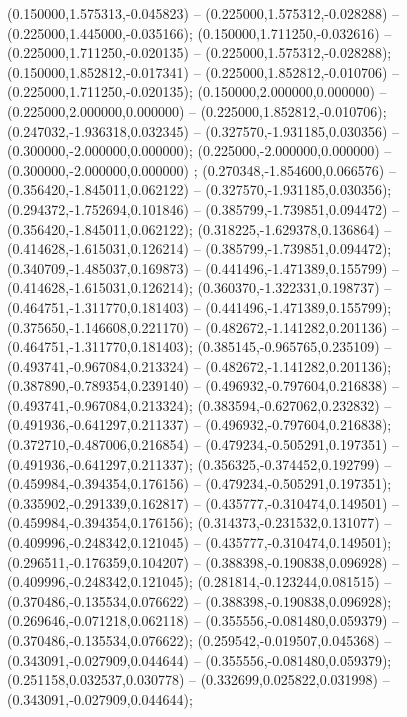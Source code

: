  (0.150000,1.575313,-0.045823) -- (0.225000,1.575312,-0.028288) -- (0.225000,1.445000,-0.035166);
 (0.150000,1.711250,-0.032616) -- (0.225000,1.711250,-0.020135) -- (0.225000,1.575312,-0.028288);
 (0.150000,1.852812,-0.017341) -- (0.225000,1.852812,-0.010706) -- (0.225000,1.711250,-0.020135);
 (0.150000,2.000000,0.000000) -- (0.225000,2.000000,0.000000) -- (0.225000,1.852812,-0.010706);
 (0.247032,-1.936318,0.032345) -- (0.327570,-1.931185,0.030356) -- (0.300000,-2.000000,0.000000);
 (0.225000,-2.000000,0.000000) -- (0.300000,-2.000000,0.000000) ;
 (0.270348,-1.854600,0.066576) -- (0.356420,-1.845011,0.062122) -- (0.327570,-1.931185,0.030356);
 (0.294372,-1.752694,0.101846) -- (0.385799,-1.739851,0.094472) -- (0.356420,-1.845011,0.062122);
 (0.318225,-1.629378,0.136864) -- (0.414628,-1.615031,0.126214) -- (0.385799,-1.739851,0.094472);
 (0.340709,-1.485037,0.169873) -- (0.441496,-1.471389,0.155799) -- (0.414628,-1.615031,0.126214);
 (0.360370,-1.322331,0.198737) -- (0.464751,-1.311770,0.181403) -- (0.441496,-1.471389,0.155799);
 (0.375650,-1.146608,0.221170) -- (0.482672,-1.141282,0.201136) -- (0.464751,-1.311770,0.181403);
 (0.385145,-0.965765,0.235109) -- (0.493741,-0.967084,0.213324) -- (0.482672,-1.141282,0.201136);
 (0.387890,-0.789354,0.239140) -- (0.496932,-0.797604,0.216838) -- (0.493741,-0.967084,0.213324);
 (0.383594,-0.627062,0.232832) -- (0.491936,-0.641297,0.211337) -- (0.496932,-0.797604,0.216838);
 (0.372710,-0.487006,0.216854) -- (0.479234,-0.505291,0.197351) -- (0.491936,-0.641297,0.211337);
 (0.356325,-0.374452,0.192799) -- (0.459984,-0.394354,0.176156) -- (0.479234,-0.505291,0.197351);
 (0.335902,-0.291339,0.162817) -- (0.435777,-0.310474,0.149501) -- (0.459984,-0.394354,0.176156);
 (0.314373,-0.231532,0.131077) -- (0.409996,-0.248342,0.121045) -- (0.435777,-0.310474,0.149501);
 (0.296511,-0.176359,0.104207) -- (0.388398,-0.190838,0.096928) -- (0.409996,-0.248342,0.121045);
 (0.281814,-0.123244,0.081515) -- (0.370486,-0.135534,0.076622) -- (0.388398,-0.190838,0.096928);
 (0.269646,-0.071218,0.062118) -- (0.355556,-0.081480,0.059379) -- (0.370486,-0.135534,0.076622);
 (0.259542,-0.019507,0.045368) -- (0.343091,-0.027909,0.044644) -- (0.355556,-0.081480,0.059379);
 (0.251158,0.032537,0.030778) -- (0.332699,0.025822,0.031998) -- (0.343091,-0.027909,0.044644);
